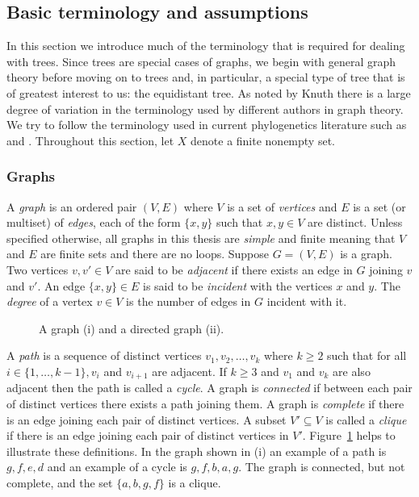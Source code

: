 \subsection{Basic terminology and assumptions}
\label{sec:basic-term-assumpt}

In this section we introduce much of the terminology that is required for
dealing with trees.  Since trees are special cases of graphs, we begin with
general graph theory before moving on to trees and, in particular, a special
type of tree that is of greatest interest to us: the equidistant tree.  As
noted by Knuth \cite{knuth97taocp1} there is a large degree of variation in
the terminology used by different authors in graph theory.  We try to follow
the terminology used in current phylogenetics literature such as
\cite{semple2003phylogenetics} and \cite{dress11lassoing}.  Throughout this
section, let $X$ denote a finite nonempty set.

\subsubsection{Graphs}
\label{sec:graphs}

A \textit{graph} is an ordered pair $(V,E)$ where $V$ is a set of
\textit{vertices} and $E$ is a set (or multiset) of \textit{edges}, each of
the form $\{x,y\}$ such that $x,y \in V$ are distinct.  Unless specified
otherwise, all graphs in this thesis are \textit{simple} and finite meaning
that $V$ and $E$ are finite sets and there are no loops.  Suppose $G = (V,E)$
is a graph. Two vertices $v,v' \in V$ are said to be \textit{adjacent} if
there exists an edge in $G$ joining $v$ and $v'$.  An edge $\{x,y\} \in E$ is
said to be \textit{incident} with the vertices $x$ and $y$.  The
\textit{degree} of a vertex $v \in V$ is the number of edges in $G$ incident
with it.

\begin{figure}
  \centering
  
  \caption{A graph (i) and a directed graph (ii).}
  \label{fig:graph-ex}
\end{figure}

A \textit{path} is a sequence of distinct vertices $v_1,v_2,\dotsc,v_k$ where
$k \geq 2$ such that for all $i \in \{1,\dotsc,k-1\}, v_i$ and $v_{i+1}$ are
adjacent.  If $k \geq 3$ and $v_1$ and $v_k$ are also adjacent then the path
is called a \textit{cycle}.  A graph is \textit{connected} if between each
pair of distinct vertices there exists a path joining them.  A graph is
\textit{complete} if there is an edge joining each pair of distinct vertices.
A subset $V' \subseteq V$ is called a \textit{clique} if there is an edge
joining each pair of distinct vertices in $V'$.  Figure~\ref{fig:graph-ex}
helps to illustrate these definitions.  In the graph shown in (i) an example
of a path is $g,f,e,d$ and an example of a cycle is $g,f,b,a,g$.  The graph is
connected, but not complete, and the set $\{a,b,g,f\}$ is a clique.

